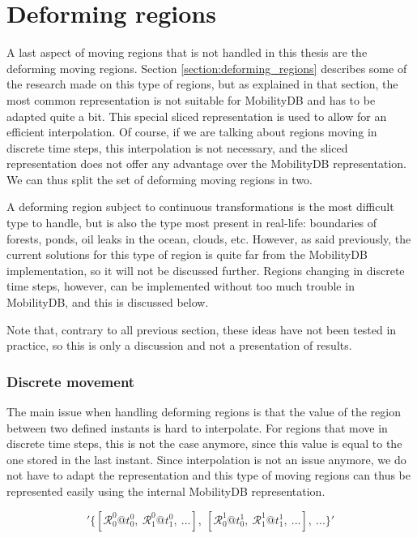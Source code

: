 
\section{Deforming regions}
\label{section:deforming}

A last aspect of moving regions that is not handled in this thesis are the deforming moving regions. Section \ref{section:deforming_regions} describes some of the research made on this type of regions, but as explained in that section, the most common representation is not suitable for MobilityDB and has to be adapted quite a bit. This special sliced representation is used to allow for an efficient interpolation. Of course, if we are talking about regions moving in discrete time steps, this interpolation is not necessary, and the sliced representation does not offer any advantage over the MobilityDB representation. We can thus split the set of deforming moving regions in two.

A deforming region subject to continuous transformations is the most difficult type to handle, but is also the type most present in real-life: boundaries of forests, ponds, oil leaks in the ocean, clouds, etc. However, as said previously, the current solutions for this type of region is quite far from the MobilityDB implementation, so it will not be discussed further. Regions changing in discrete time steps, however, can be implemented without too much trouble in MobilityDB, and this is discussed below.

Note that, contrary to all previous section, these ideas have not been tested in practice, so this is only a discussion and not a presentation of results.

\subsubsection{Discrete movement}

The main issue when handling deforming regions is that the value of the region between two defined instants is hard to interpolate. For regions that move in discrete time steps, this is not the case anymore, since this value is equal to the one stored in the last instant. Since interpolation is not an issue anymore, we do not have to adapt the representation and this type of moving regions can thus be represented easily using the internal MobilityDB representation. 

\[
    '\{[\mathcal{R}_0^0@t_0^0,\ \mathcal{R}_1^0@t_1^0,\ ...],\ [\mathcal{R}_0^1@t_0^1,\ \mathcal{R}_1^1@t_1^1,\ ...],\ ...\}'
\]

